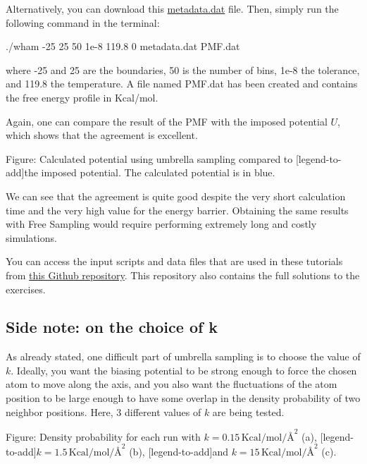 \noindent Alternatively, you can download this \href{https://lammpstutorials.github.io/lammpstutorials-inputs/level3/free-energy-calculation/BiasedSampling/metadata.dat}{metadata.dat} file.
Then, simply run the following command in the terminal:

\begin{lcverbatim}
./wham -25 25 50 1e-8 119.8 0 metadata.dat PMF.dat
\end{lcverbatim}

\noindent where -25 and 25 are the boundaries, 50 is the number of bins,
1e-8 the tolerance, and 119.8 the temperature. A file named
PMF.dat has been created and contains the free energy
profile in Kcal/mol.

\vspace{0.25cm} \noindent Again, one can compare the result of the PMF with the imposed potential $U$,
which shows that the agreement is excellent.

\vspace{0.25cm} Figure: Calculated potential using umbrella sampling compared to
[legend-to-add]the imposed potential. The calculated potential is in blue.

\vspace{0.25cm} \noindent We can see that the agreement is quite good despite the very short calculation time
and the very high value for the energy barrier. Obtaining the same 
results with Free Sampling would require performing extremely long
and costly simulations.

\vspace{0.25cm} \noindent You can access the input scripts and data files that
are used in these tutorials from \href{https://github.com/lammpstutorials/lammpstutorials-inputs/}{this Github repository}.
This repository also contains the full solutions to the exercises.

\subsection{Side note: on the choice of k}
\noindent As already stated, one difficult part of umbrella sampling is to choose the value of $k$.
Ideally, you want the biasing potential to be strong enough to force
the chosen atom to move along the axis, and you also want the
fluctuations of the atom position to be large enough to
have some overlap in the density probability of two
neighbor positions. Here, 3 different values of $k$ are being tested.

\vspace{0.25cm} Figure: Density probability for each run with $k = 0.15\,\text{Kcal}/\text{mol}/Å^2$ (a),
[legend-to-add]$k = 1.5\,\text{Kcal}/\text{mol}/Å^2$ (b),
[legend-to-add]and $k = 15\,\text{Kcal}/\text{mol}/Å^2$ (c).

